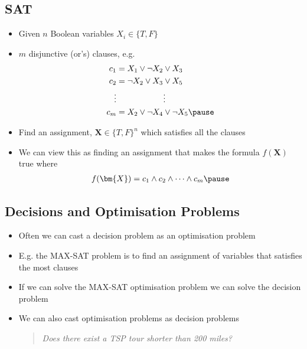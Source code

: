 \begin{slide}
\section[-1.5]{SAT}

\begin{PauseHighLight}
  \begin{itemize}\squeeze
  \item Given $n$ Boolean variables $X_i\in\{T,F\}$\pause
  \item $m$ disjunctive (or's) clauses, e.g.
    \begin{align*}
      c_1 &= X_1 \vee \neg X_2 \vee X_3 \\
      c_2 &= \neg X_2 \vee  X_3 \vee X_5 \\
      \vdots & \hspace{2cm} \vdots \\
      c_m &= X_2 \vee \neg X_4 \vee \neg X_5\pause
    \end{align*}
  \item Find an assignment, $\bm{X} \in \{T,F\}^n$ which satisfies all
    the clauses\pause
  \item We can view this as finding an assignment that makes the
    formula $f(\bm{X})$ true where
    \begin{align*}
      f(\bm{X}) = c_1 \wedge c_2 \wedge \cdots \wedge c_m\pause
    \end{align*}
  \end{itemize}
\end{PauseHighLight}

\end{slide}


\begin{slide}
\section{Decisions and Optimisation Problems}

\begin{PauseHighLight}
  \begin{itemize}
  \item Often we can cast a decision problem as an optimisation problem\pause
  \item E.g. the MAX-SAT problem is to find an assignment of variables
    that satisfies the most clauses\pause
  \item If we can solve the MAX-SAT optimisation problem we can solve
    the decision problem\pause
  \item We can also cast optimisation problems as decision problems
    \begin{quote}
      \textit{Does there exist a TSP tour shorter than 200 miles?}\pause
    \end{quote}
  \end{itemize}
\end{PauseHighLight}

\end{slide}


